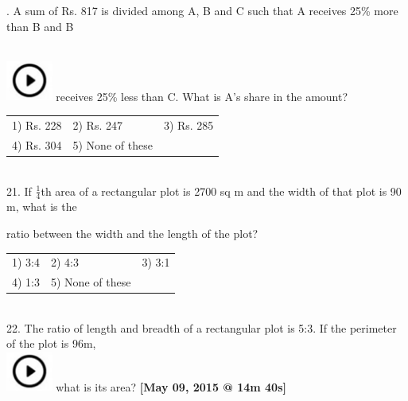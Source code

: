 \documentclass{article}
\begin{document}
	\noindent 
	\newpage
	. A sum of Rs. 817 is divided among A, B and C such that A receives 25\% more than B and B
	
	\noindent  
	\noindent \\ \includegraphics*[width=0.60in, height=0.52in]{images/image1} receives 25\% less than C. What is A's share in the amount?
	
	\noindent \begin{tabular}{p{1.7in} p{1.6in} p{1.6in}} \\ 
 1) Rs. 228                   &  2) Rs. 247            &  3) Rs. 285            \\
4) Rs. 304            & 5) None of these  \\
\end{tabular}
	
	\noindent 
	
	\noindent 
	
	\noindent \\   

	21. If $ \frac{1}{4} $th area of a rectangular plot is 2700 sq m and the width of that plot is 90 m, what is the
	
	\noindent 
	
	\noindent ratio between the width and the length of the plot?
	
	\noindent 
	
	\noindent \begin{tabular}{p{1.7in} p{1.6in} p{1.6in}} \\ 
 1) 3:4                       &  2) 4:3                &  3) 3:1                \\
4) 1:3                & 5) None of these  \\
\end{tabular}
	
	\noindent 
	
	\noindent 
	
	\noindent \\   
	
	22. The ratio of length and breadth of a rectangular plot is 5:3. If the perimeter of the plot is 96m,
	\noindent \\ \includegraphics*[width=0.60in, height=0.52in]{images/image1} what is its area? \textbf{[May 09, 2015 @ 14m 40s]}
	
\end{document}
